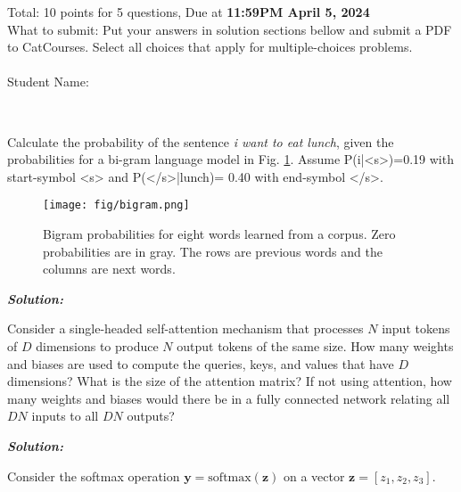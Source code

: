 \documentclass[addpoints,12pt]{exam}
\begin{document}
\noindent Total: 10 points for 5 questions, Due at \textbf{11:59PM April 5, 2024} \\
\noindent What to submit: Put your answers in solution sections bellow and submit a PDF to CatCourses. Select all choices that apply for multiple-choices problems. \\ \\
\noindent Student Name:
\runningheadrule
{}

\begin{center}
\makebox[\textwidth]{\enspace\hrulefill}\\ 
\end{center}



\begin{questions}

\question [1] Calculate the probability of the sentence \textit{i want to eat lunch}, given the probabilities for a bi-gram language model in Fig. \ref{fig:bigram}. Assume P(i|<s>)=0.19 with start-symbol <s> and P(</s>|lunch)= 0.40 with end-symbol </s>.

\begin{figure}[hp]
    \centering
    \texttt{[image: fig/bigram.png]}
    \caption{Bigram probabilities for eight words learned from a corpus. Zero probabilities are in gray. The rows are previous words and the columns are next words.}
    \label{fig:bigram}
\end{figure}

\textbf{\textit{{\color{coral} Solution:}}}

\question [2] Consider a single-headed self-attention mechanism that processes $N$ input tokens of $D$ dimensions to produce $N$ output tokens of the same size. How many weights and biases are used to compute the queries, keys, and values that have $D$ dimensions? What is the size of the attention matrix? If not using attention, how many weights and biases would there be in a fully connected network relating all $DN$ inputs to all $DN$ outputs?

\textbf{\textit{{\color{coral} Solution:}}}

\question [3] Consider the softmax operation $\mathbf{y}=\text{softmax}(\mathbf{z})$ on a vector $\mathbf{z}=[z_1,z_2,z_3]$.

\end{questions}
\end{document}
